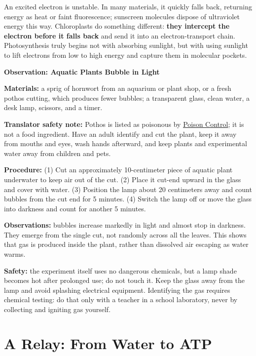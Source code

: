 An excited electron is unstable. In many materials, it quickly falls back, returning energy as heat or faint fluorescence; sunscreen molecules dispose of ultraviolet energy this way. Chloroplasts do something different: \textbf{they intercept the electron before it falls back} and send it into an electron-transport chain. Photosynthesis truly begins not with absorbing sunlight, but with using sunlight to lift electrons from low to high energy and capture them in molecular pockets.

\begin{shiyan}
\textbf{Observation: Aquatic Plants Bubble in Light}

\textbf{Materials:} a sprig of hornwort from an aquarium or plant shop, or a fresh pothos cutting, which produces fewer bubbles; a transparent glass, clean water, a desk lamp, scissors, and a timer.

\textbf{Translator safety note:} Pothos is listed as poisonous by \href{https://www.poison.org/articles/plant}{Poison Control}; it is not a food ingredient. Have an adult identify and cut the plant, keep it away from mouths and eyes, wash hands afterward, and keep plants and experimental water away from children and pets.

\textbf{Procedure:} (1) Cut an approximately 10-centimeter piece of aquatic plant underwater to keep air out of the cut. (2) Place it cut-end upward in the glass and cover with water. (3) Position the lamp about 20 centimeters away and count bubbles from the cut end for 5 minutes. (4) Switch the lamp off or move the glass into darkness and count for another 5 minutes.

\textbf{Observations:} bubbles increase markedly in light and almost stop in darkness. They emerge from the single cut, not randomly across all the leaves. This shows that gas is produced inside the plant, rather than dissolved air escaping as water warms.

\textbf{Safety:} the experiment itself uses no dangerous chemicals, but a lamp shade becomes hot after prolonged use; do not touch it. Keep the glass away from the lamp and avoid splashing electrical equipment. Identifying the gas requires chemical testing: do that only with a teacher in a school laboratory, never by collecting and igniting gas yourself.
\end{shiyan}

\section{A Relay: From Water to ATP}

